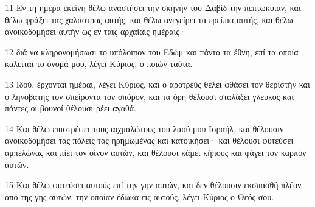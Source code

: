 \par 11 Εν τη ημέρα εκείνη θέλω αναστήσει την σκηνήν του Δαβίδ την πεπτωκυίαν, και θέλω φράξει τας χαλάστρας αυτής, και θέλω ανεγείρει τα ερείπια αυτής, και θέλω ανοικοδομήσει αυτήν ως εν ταις αρχαίαις ημέραις·
\par 12 διά να κληρονομήσωσι το υπόλοιπον του Εδώμ και πάντα τα έθνη, επί τα οποία καλείται το όνομά μου, λέγει Κύριος, ο ποιών ταύτα.
\par 13 Ιδού, έρχονται ημέραι, λέγει Κύριος, και ο αροτρεύς θέλει φθάσει τον θεριστήν και ο ληνοβάτης τον σπείροντα τον σπόρον, και τα όρη θέλουσι σταλάξει γλεύκος και πάντες οι βουνοί θέλουσι ρέει αγαθά.
\par 14 Και θέλω επιστρέψει τους αιχμαλώτους του λαού μου Ισραήλ, και θέλουσιν ανοικοδομήσει τας πόλεις τας ηρημωμένας και κατοικήσει· και θέλουσι φυτεύσει αμπελώνας και πίει τον οίνον αυτών, και θέλουσι κάμει κήπους και φάγει τον καρπόν αυτών.
\par 15 Και θέλω φυτεύσει αυτούς επί την γην αυτών, και δεν θέλουσιν εκσπασθή πλέον από της γης αυτών, την οποίαν έδωκα εις αυτούς, λέγει Κύριος ο Θεός σου.


